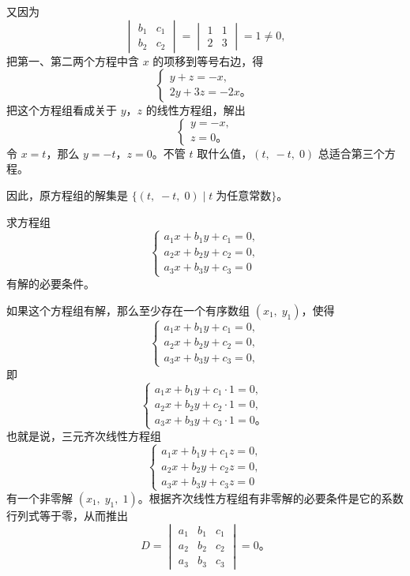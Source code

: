 又因为
$$\begin{vmatrix*}
    b_1 & c_1 \\
    b_2 & c_2
\end{vmatrix*} = \begin{vmatrix*}
    1 & 1 \\
    2 & 3
\end{vmatrix*} = 1 \neq 0,
$$
把第一、第二两个方程中含 $x$ 的项移到等号右边，得
$$\begin{cases}
    y + z = -x, \\
    2y + 3z = -2x \text{。}
\end{cases}$$
把这个方程组看成关于 $y$，$z$ 的线性方程组，解出
$$\begin{cases}
    y = -x, \\
    z = 0 \text{。}
\end{cases}$$
令 $x = t$，那么 $y = -t$，$z = 0$。不管 $t$ 取什么值，$(t,\; -t,\; 0)$ 总适合第三个方程。

因此，原方程组的解集是 $\{ (t,\; -t,\; 0) \mid  t\; \text{为任意常数} \}$。



\liti 求方程组
$$\begin{cases}
    a_1x + b_1y + c_1 = 0, \\
    a_2x + b_2y + c_2 = 0, \\
    a_3x + b_3y + c_3 = 0
\end{cases}$$
有解的必要条件。

\jie 如果这个方程组有解，那么至少存在一个有序数组 $(x_1,\; y_1)$，使得
$$\begin{cases}
    a_1x + b_1y + c_1 = 0, \\
    a_2x + b_2y + c_2 = 0, \\
    a_3x + b_3y + c_3 = 0,
\end{cases}$$
即
$$\begin{cases}
    a_1x + b_1y + c_1 \cdot 1 = 0, \\
    a_2x + b_2y + c_2 \cdot 1 = 0, \\
    a_3x + b_3y + c_3 \cdot 1 = 0 \text{。}
\end{cases}$$
也就是说，三元齐次线性方程组
$$\begin{cases}
    a_1x + b_1y + c_1z = 0, \\
    a_2x + b_2y + c_2z = 0, \\
    a_3x + b_3y + c_3z = 0
\end{cases}$$
有一个非零解 $(x_1,\; y_1,\; 1)$。根据齐次线性方程组有非零解的必要条件是它的系数行列式等于零，从而推出
$$D = \begin{vmatrix*}
	a_1 & b_1 & c_1 \\
	a_2 & b_2 & c_2 \\
	a_3 & b_3 & c_3
\end{vmatrix*} = 0 \text{。}$$

